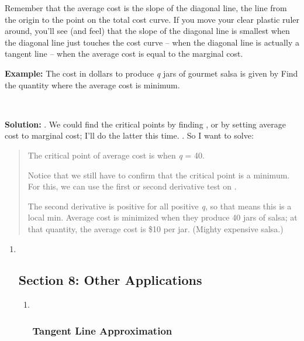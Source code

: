 Remember that the average cost is the slope of the diagonal line, the
line from the origin to the point on the total cost curve. If you move
your clear plastic ruler around, you'll see (and feel) that the slope of
the diagonal line is smallest when the diagonal line just touches the
cost curve -- when the diagonal line is actually a tangent line -- when
the average cost is equal to the marginal cost.

\textbf{Example:} The cost in dollars to produce \emph{q} jars of
gourmet salsa is given by Find the quantity where the average cost is
minimum.

\textbf{\\
}

\textbf{Solution:} . We could find the critical points by finding , or
by setting average cost to marginal cost; I'll do the latter this time.
. So I want to solve:

\begin{quote}
The critical point of average cost is when \emph{q} = 40.

Notice that we still have to confirm that the critical point is a
minimum. For this, we can use the first or second derivative test on .

The second derivative is positive for all positive \emph{q}, so that
means this is a local min. Average cost is minimized when they produce
40 jars of salsa; at that quantity, the average cost is \$10 per jar.
(Mighty expensive salsa.)
\end{quote}

\begin{enumerate}
\item ~
  \subsection{}\label{section-2}

  \hypertarget{section-8-other-applications}{\subsection{Section 8:
  Other Applications}\label{section-8-other-applications}}

  \begin{enumerate}
  \item ~
    \subsubsection{}\label{section-3}

    \subsubsection{Tangent Line
    Approximation}\label{tangent-line-approximation}
  \end{enumerate}
\end{enumerate}

